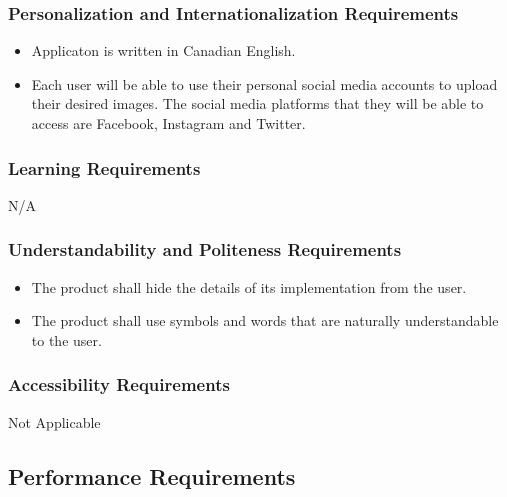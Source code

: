 \documentclass[]{article}
\begin{document}
\subsubsection{Personalization and Internationalization Requirements}
\label{ssub:personalization_and_internationalization_requirements}
\begin{itemize}
	\item Applicaton is written in Canadian English.
	\item Each user will be able to use their personal social media accounts to upload their desired images. The social media platforms that they will be able to access are Facebook, Instagram and Twitter.
\end{itemize}

\subsubsection{Learning Requirements}
\label{ssub:learning_requirements}
\begin{itemize}
	N/A
\end{itemize}

\subsubsection{Understandability and Politeness Requirements}
\label{ssub:understandability_and_politeness_requirements}
\begin{itemize}
	\item The product shall hide the details of its implementation from the user.
	\item The product shall use symbols and words that are naturally understandable to the user.
\end{itemize}

\subsubsection{Accessibility Requirements}
\label{ssub:accessibility_requirements}
	Not Applicable


\subsection{Performance Requirements}
\label{sub:performance_requirements}
\end{document}
